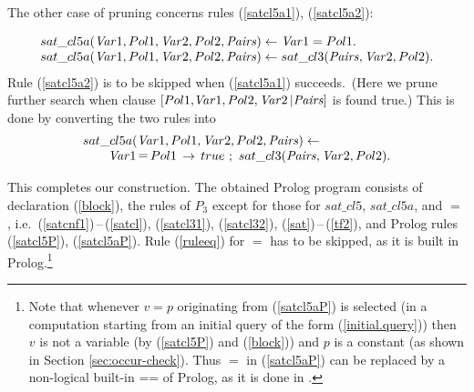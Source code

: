 \documentclass{tlp}
\begin{document}
The other case of pruning concerns rules (\ref{satcl5a1}), (\ref{satcl5a2}):
\par
{\footnotesize
 \[
 \begin{array}{l}
  sat\_cl5a({\it Var}1, Pol1, {\it Var}2, Pol2, {\it Pairs}) \gets {\it Var}1 = Pol1.
\\
  sat\_cl5a({\it Var}1, Pol1, {\it Var}2, Pol2, {\it Pairs}) \gets sat\_cl3( {\it Pairs}, {\it Var}2, Pol2).
 \end{array}
 \]
}Rule (\ref{satcl5a2}) is to be skipped when (\ref{satcl5a1}) succeeds.\
(Here we prune further search when clause 
$[{Pol1,}{\it Var}1, Pol2, {\it Var}2\, | {\it Pairs}]$ 
is found true.)
This is done by converting the two rules into
\begin{equation}
\label{satcl5aP}
  \begin{array}{l}
  sat\_cl5a({\it Var}1, Pol1, {\it Var}2, Pol2, {\it Pairs}) \gets
  \\\qquad
   {\it Var}1 \mathop= Pol1 \, \to \, true \ ;  \
   sat\_cl3( {\it Pairs}, {\it Var}2, Pol2).
  \end{array}
\end{equation}



This completes our construction.
The obtained Prolog program consists of declaration (\ref{block}),
the rules of $P_3$ except for those for $sat\_cl5$, $sat\_cl5a$,  and
$=$, i.e.\ 
(\ref{satcnf1})\,--\,(\ref{satcl}), (\ref{satcl31}), (\ref{satcl32}), 
(\ref{sat})\,--\,(\ref{tf2}),
and Prolog rules  (\ref{satcl5P}), (\ref{satcl5aP}).
Rule (\ref{ruleeq}) for $=$ has to be skipped, as it is built in Prolog.\footnote{Note that whenever $v=p$ originating from (\ref{satcl5aP}) is selected
      (in a computation starting from an initial query of the form
      (\ref{initial.query})) then $v$ is not a variable 
      (by (\ref{satcl5P}) and (\ref{block}))
      and $p$ is a constant (as shown in Section \ref{sec:occur-check}).
Thus $=$ in (\ref{satcl5aP}) can be replaced by
      a non-logical built-in {==} of Prolog, 
as it is done in \cite{howe.king.tcs-shorter}.
}
\end{document}
